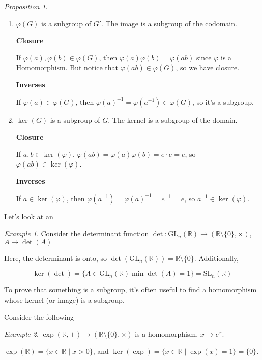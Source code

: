 \documentclass[12pt]{article}
\def\phi{\varphi}
\def\gl{\text{GL}}
\def\sl{\text{SL}}
\def\R{{\mathbb R}}
\theoremstyle{remark}
\newtheorem{proposition}{Proposition}
\theoremstyle{remark}
\theoremstyle{remark}
\newtheorem{example}{Example}
\theoremstyle{remark}
\theoremstyle{remark}
\begin{document}
\begin{proposition}
  \begin{enumerate}
    \item $\phi(G)$ is a subgroup of $G'$. The image is a subgroup of the
          codomain.

            {\bf Closure}

          If $\phi(a), \phi(b) \in \phi(G)$, then $\phi(a) \phi(b) = \phi(ab)$ since
          $\phi$ is a Homomorphism. But notice that $\phi(ab) \in \phi(G)$, so we have
          closure.

            {\bf Inverses}

          If $\phi(a) \in \phi(G)$, then $\phi(a)^{-1} = \phi(a^{-1}) \in \phi(G)$, so
          it's a subgroup.

    \item $\ker(G)$ is a subgroup of $G$. The kernel is a subgroup of the domain.

            {\bf Closure}

          If $a, b \in \ker(\phi)$, $\phi(ab) = \phi(a) \phi(b) = e \cdot e = e$, so
          $\phi(ab) \in \ker(\phi)$.

            {\bf Inverses}

          If $a \in \ker(\phi)$, then $\phi(a^{-1}) = \phi(a)^{-1} = e^{-1} = e$, so
          $a^{-1} \in \ker(\phi)$.
  \end{enumerate}
\end{proposition}

Let's look at an

\begin{example}
	Consider the determinant function $\det: \gl_n(\R) \to (\R \setminus \{0\},
		\times)$, $A \to \det(A)$

	Here, the determinant is onto, so $\det(\gl_n(\R)) = \R \setminus \{0\}$.
	Additionally,

	\[
		\ker(\det) = \{A \in \gl_n(\R) \min \det(A) = 1 \} = \sl_n(\R)
	\]
\end{example}

To prove that something is a subgroup, it's often useful to find a homomorphism
whose kernel (or image) is a subgroup.

Consider the following

\begin{example}
	$\exp(\R, +) \to (\R \setminus \{0\}, \times)$ is a homomorphism, $x \to e^x$.

  $\exp(\R) = \{x \in \R \mid x > 0\}$, and $\ker(\exp) = \{x \in \R \mid
  \exp(x) = 1 \} = \{0\}$.
\end{example}
\end{document}
